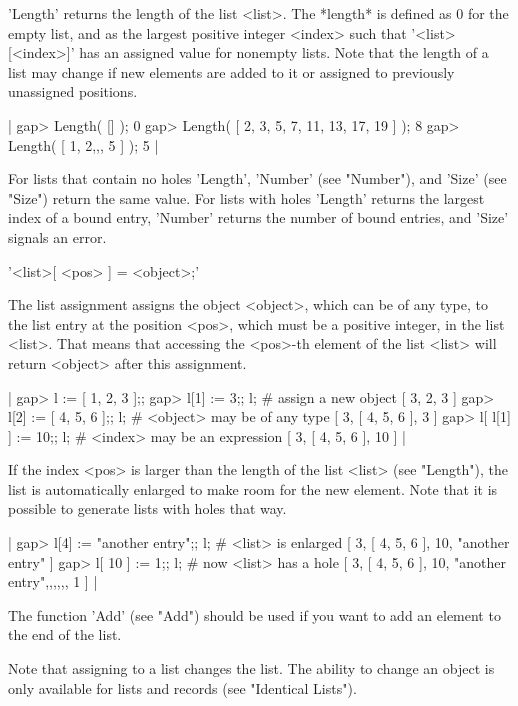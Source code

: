 'Length' returns the length of the list  <list>.  The *length* is defined
as 0 for the empty list, and as the largest positive integer <index> such
that '<list>[<index>]'  has an assigned value  for  nonempty lists.  Note
that the length of a list may  change if new elements are  added to it or
assigned to previously unassigned positions.

|    gap> Length( [] );
    0
    gap> Length( [ 2, 3, 5, 7, 11, 13, 17, 19 ] );
    8
    gap> Length( [ 1, 2,,, 5 ] );
    5 |

For lists  that contain no holes 'Length',  'Number' (see  "Number"), and
'Size' (see "Size") return the same value.  For lists with holes 'Length'
returns the largest  index of a  bound entry, 'Number' returns the number
of bound entries, and 'Size' signals an error.

%

'<list>[ <pos> ] \:= <object>;'

The list  assignment  assigns the  object  <object>, which can be  of any
type, to the list  entry at the position <pos>, which must  be a positive
integer, in the  list  <list>.  That means that  accessing  the  <pos>-th
element of the list <list> will return <object> after this assignment.

|    gap> l := [ 1, 2, 3 ];;
    gap> l[1] := 3;;  l;                # assign a new object
    [ 3, 2, 3 ]
    gap> l[2] := [ 4, 5, 6 ];;  l;      # <object> may be of any type
    [ 3, [ 4, 5, 6 ], 3 ]
    gap> l[ l[1] ] := 10;;  l;          # <index> may be an expression
    [ 3, [ 4, 5, 6 ], 10 ] |

If  the index  <pos> is larger  than the  length of  the list <list> (see
"Length"),  the list is automatically enlarged to make room  for the  new
element.  Note that it is possible to generate lists with holes that way.

|    gap> l[4] := "another entry";;  l; # <list> is enlarged
    [ 3, [ 4, 5, 6 ], 10, "another entry" ]
    gap> l[ 10 ] := 1;;  l;            # now <list> has a hole
    [ 3, [ 4, 5, 6 ], 10, "another entry",,,,,, 1 ] |

The   function 'Add' (see  "Add") should  be used  if you  want to add an
element to the end of the list.

Note that assigning to a list changes the list.  The ability to change an
object is only available for lists and records (see "Identical Lists").

